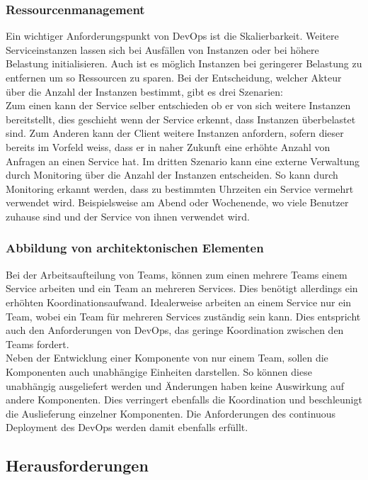 \subsubsection{Ressourcenmanagement}

Ein wichtiger Anforderungspunkt von DevOps ist die Skalierbarkeit. Weitere Serviceinstanzen lassen sich bei Ausfällen von Instanzen oder bei höhere Belastung initialisieren. Auch ist es möglich Instanzen bei geringerer Belastung zu entfernen um so Ressourcen zu sparen. Bei der Entscheidung, welcher Akteur über die Anzahl der Instanzen bestimmt, gibt es drei Szenarien:\\
Zum einen kann der Service selber entschieden ob er von sich weitere Instanzen bereitstellt, dies geschieht wenn der Service erkennt, dass Instanzen überbelastet sind. Zum Anderen kann der Client weitere Instanzen anfordern, sofern dieser bereits im Vorfeld weiss, dass er in naher Zukunft eine erhöhte Anzahl von Anfragen an einen Service hat. Im dritten Szenario kann eine externe Verwaltung durch Monitoring über die Anzahl der Instanzen entscheiden. So kann durch Monitoring erkannt werden, dass zu bestimmten Uhrzeiten ein Service vermehrt verwendet wird. Beispielsweise am Abend oder Wochenende, wo viele Benutzer zuhause sind und der Service von ihnen verwendet wird. 

\subsubsection{Abbildung von architektonischen Elementen}

Bei der Arbeitsaufteilung von Teams, können zum einen mehrere Teams einem Service arbeiten und ein Team an mehreren Services. Dies benötigt allerdings ein erhöhten Koordinationsaufwand. Idealerweise arbeiten an einem Service nur ein Team, wobei ein Team für mehreren Services zuständig sein kann. Dies entspricht auch den Anforderungen von DevOps, das geringe Koordination zwischen den Teams fordert.\\

Neben der Entwicklung einer Komponente von nur einem Team, sollen die Komponenten auch unabhängige Einheiten darstellen. So können diese unabhängig ausgeliefert werden und Änderungen haben keine Auswirkung auf andere Komponenten. Dies verringert ebenfalls die Koordination und beschleunigt die Auslieferung einzelner Komponenten. Die Anforderungen des continuous Deployment des DevOps werden damit ebenfalls erfüllt. 


\subsection{Herausforderungen}

